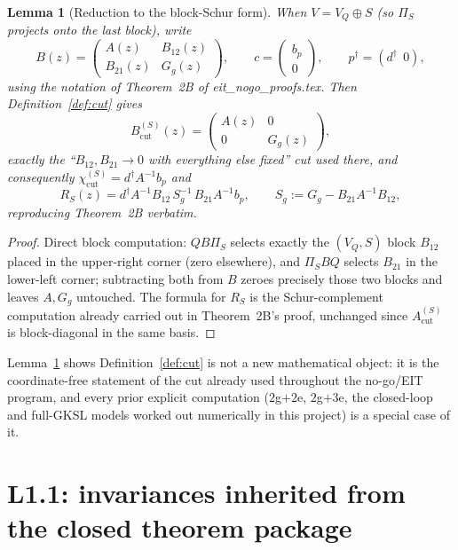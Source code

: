 \documentclass[11pt,a4paper]{article}
\newtheorem{lemma}[theorem]{Lemma}
\theoremstyle{remark}
\begin{document}
\begin{lemma}[Reduction to the block-Schur form]\label{lem:reduction}
When $V=V_Q\oplus S$ (so $\Pi_S$ projects onto the last block), write
\[
B(z)=\begin{pmatrix}A(z) & B_{12}(z)\\ B_{21}(z) & G_g(z)\end{pmatrix},
\qquad c=\begin{pmatrix}b_p\\0\end{pmatrix},\qquad
p^\dagger=(d^\dagger\ \ 0),
\]
using the notation of Theorem~2B of
\emph{eit\_nogo\_proofs.tex}. Then Definition~\ref{def:cut} gives
\[
B^{(S)}_{\mathrm{cut}}(z)=\begin{pmatrix}A(z)&0\\0&G_g(z)\end{pmatrix},
\]
exactly the ``$B_{12},B_{21}\to0$ with everything else fixed'' cut used
there, and consequently
$\chi^{(S)}_{\mathrm{cut}}=d^\dagger A^{-1}b_p$ and
\[
R_S(z)=d^\dagger A^{-1}B_{12}\,S_g^{-1}\,B_{21}A^{-1}b_p,
\qquad S_g:=G_g-B_{21}A^{-1}B_{12},
\]
reproducing Theorem~2B verbatim.
\end{lemma}

\begin{proof}
Direct block computation: $Q B\Pi_S$ selects exactly the $(V_Q,S)$ block
$B_{12}$ placed in the upper-right corner (zero elsewhere), and
$\Pi_S BQ$ selects $B_{21}$ in the lower-left corner; subtracting both from
$B$ zeroes precisely those two blocks and leaves $A,G_g$ untouched. The
formula for $R_S$ is the Schur-complement computation already carried out
in Theorem~2B's proof, unchanged since $A^{(S)}_{\mathrm{cut}}$ is
block-diagonal in the same basis.
\end{proof}

Lemma~\ref{lem:reduction} shows Definition~\ref{def:cut} is not a new
mathematical object: it is the coordinate-free statement of the cut
already used throughout the no-go/EIT program, and every prior explicit
computation ($2$g$+2$e, $2$g$+3$e, the closed-loop and full-GKSL models
worked out numerically in this project) is a special case of it.

\section{L1.1: invariances inherited from the closed theorem package}
\end{document}
